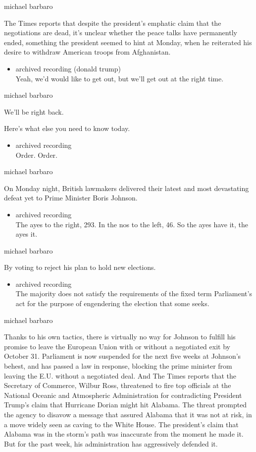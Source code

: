 michael barbaro

The Times reports that despite the president's emphatic claim that the
negotiations are dead, it's unclear whether the peace talks have
permanently ended, something the president seemed to hint at Monday,
when he reiterated his desire to withdraw American troops from
Afghanistan.

\begin{itemize}
\tightlist
\item
  archived recording (donald trump)\\
  Yeah, we'd would like to get out, but we'll get out at the right time.
\end{itemize}

michael barbaro

We'll be right back.

Here's what else you need to know today.

\begin{itemize}
\tightlist
\item
  archived recording\\
  Order. Order.
\end{itemize}

michael barbaro

On Monday night, British lawmakers delivered their latest and most
devastating defeat yet to Prime Minister Boris Johnson.

\begin{itemize}
\tightlist
\item
  archived recording\\
  The ayes to the right, 293. In the nos to the left, 46. So the ayes
  have it, the ayes it.
\end{itemize}

michael barbaro

By voting to reject his plan to hold new elections.

\begin{itemize}
\tightlist
\item
  archived recording\\
  The majority does not satisfy the requirements of the fixed term
  Parliament's act for the purpose of engendering the election that some
  seeks.
\end{itemize}

michael barbaro

Thanks to his own tactics, there is virtually no way for Johnson to
fulfill his promise to leave the European Union with or without a
negotiated exit by October 31. Parliament is now suspended for the next
five weeks at Johnson's behest, and has passed a law in response,
blocking the prime minister from leaving the E.U. without a negotiated
deal. And The Times reports that the Secretary of Commerce, Wilbur Ross,
threatened to fire top officials at the National Oceanic and Atmospheric
Administration for contradicting President Trump's claim that Hurricane
Dorian might hit Alabama. The threat prompted the agency to disavow a
message that assured Alabama that it was not at risk, in a move widely
seen as caving to the White House. The president's claim that Alabama
was in the storm's path was inaccurate from the moment he made it. But
for the past week, his administration has aggressively defended it.

